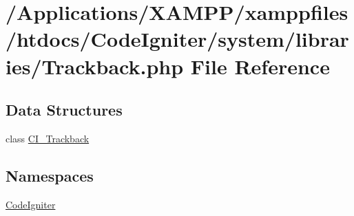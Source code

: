 \hypertarget{_trackback_8php}{}\section{/\+Applications/\+X\+A\+M\+P\+P/xamppfiles/htdocs/\+Code\+Igniter/system/libraries/\+Trackback.php File Reference}
\label{_trackback_8php}
\subsection*{Data Structures}
\begin{DoxyCompactItemize}
\item 
class \mbox{\hyperlink{class_c_i___trackback}{C\+I\+\_\+\+Trackback}}
\end{DoxyCompactItemize}
\subsection*{Namespaces}
\begin{DoxyCompactItemize}
\item 
 \mbox{\hyperlink{namespace_code_igniter}{Code\+Igniter}}
\end{DoxyCompactItemize}
